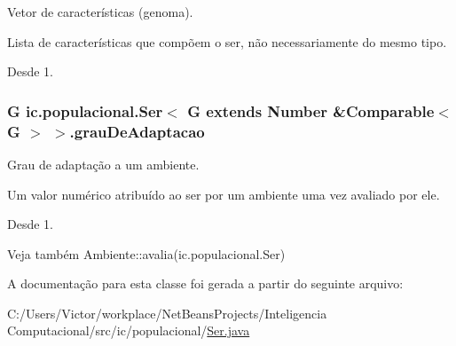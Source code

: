 Vetor de características (genoma). 

Lista de características que compõem o ser, não necessariamente do mesmo tipo.

\begin{DoxySince}{Desde}
1. 
\end{DoxySince}
\hypertarget{classic_1_1populacional_1_1_ser_3_01_g_01extends_01_number_01_6_comparable_3_01_g_01_4_01_4_ae66080e68d6274384056823b7868be0f}{
\subsubsection[{grau\-De\-Adaptacao}]{\setlength{\rightskip}{0pt plus 5cm}G ic.\-populacional.\-Ser$<$ G extends Number \&Comparable$<$ G $>$ $>$.grau\-De\-Adaptacao\hspace{0.3cm}{\ttfamily [protected]}}}\label{classic_1_1populacional_1_1_ser_3_01_g_01extends_01_number_01_6_comparable_3_01_g_01_4_01_4_ae66080e68d6274384056823b7868be0f}


Grau de adaptação a um ambiente. 

Um valor numérico atribuído ao ser por um ambiente uma vez avaliado por ele.

\begin{DoxySince}{Desde}
1.
\end{DoxySince}
\begin{DoxySeeAlso}{Veja também}
Ambiente\-::avalia(ic.\-populacional.\-Ser) 
\end{DoxySeeAlso}


A documentação para esta classe foi gerada a partir do seguinte arquivo\-:\begin{DoxyCompactItemize}
\item 
C\-:/\-Users/\-Victor/workplace/\-Net\-Beans\-Projects/\-Inteligencia Computacional/src/ic/populacional/\hyperlink{_ser_8java}{Ser.\-java}\end{DoxyCompactItemize}

